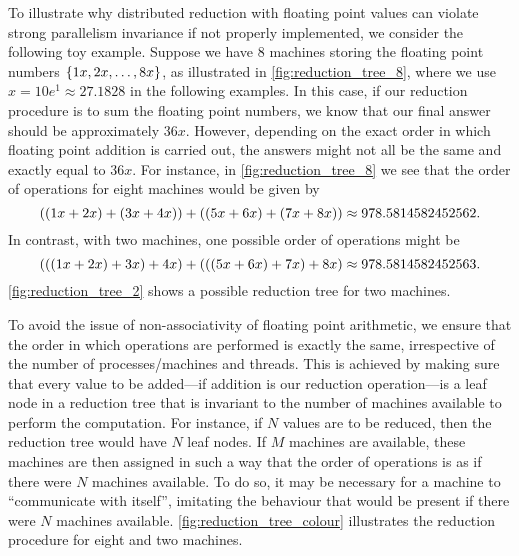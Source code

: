 To illustrate why distributed reduction with floating point values can violate 
strong parallelism invariance if not properly implemented, we consider the 
following toy example. 
Suppose we have 8 machines storing the floating point numbers $\cbra{1x, 2x, \ldots, 8x}$, 
as illustrated in \cref{fig:reduction_tree_8}, where we use $x = 10 e^1 \approx 27.1828$
in the following examples.
In this case, if our reduction procedure is to sum the floating point numbers, 
we know that our final answer should be approximately $36x$. 
However, depending on the exact order in which floating point addition is carried out, 
the answers might not all be the same and exactly equal to $36x$.
For instance, in \cref{fig:reduction_tree_8} we see that the order of operations 
for eight machines would be given by 
\[
  ((1x + 2x) + (3x + 4x)) + ((5x + 6x) + (7x + 8x)) \\
  \approx 978.5814582452562.
\]
In contrast, with two machines, one possible order of operations might be 
\[
  (((1x + 2x) + 3x) + 4x) + (((5x + 6x) + 7x) + 8x) \\
  \approx 978.5814582452563.
\]
\cref{fig:reduction_tree_2} shows a possible reduction tree for two machines.

 




To avoid the issue of non-associativity of 
floating point arithmetic, we ensure that the order in which operations are performed 
is exactly the same, irrespective of the number of processes/machines and threads. 
This is achieved by making sure that every value to be added---if addition is our 
reduction operation---is a leaf node in a reduction tree that is invariant to the 
number of machines available to perform the computation. 
For instance, if $N$ values are to be reduced, then the reduction tree would have 
$N$ leaf nodes. If $M$ machines are available, these machines are then assigned 
in such a way that the order of operations is as if there were $N$ machines available. 
To do so, it may be necessary for a machine to ``communicate with itself'', 
imitating the behaviour that would be present if there were $N$ machines available.
\cref{fig:reduction_tree_colour} illustrates the reduction procedure for eight and 
two machines.



